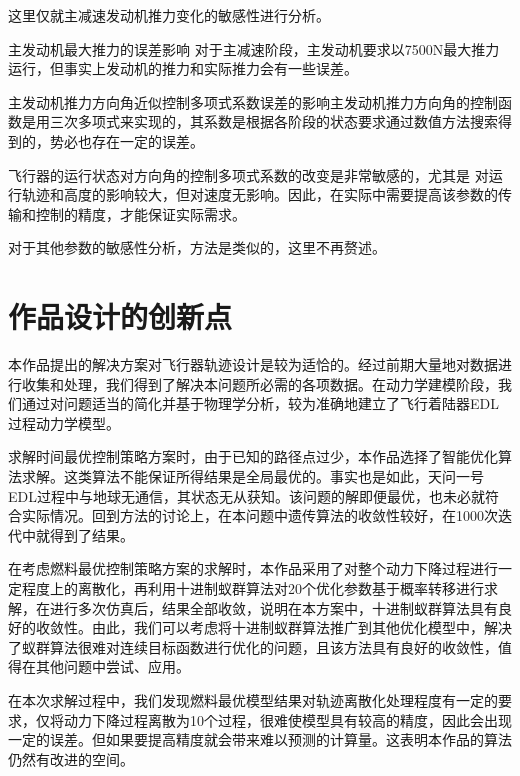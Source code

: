 \documentclass[UTF8,12pt]{ctexart}
\begin{document}
这里仅就主减速发动机推力变化的敏感性进行分析。

主发动机最大推力的误差影响 对于主减速阶段，主发动机要求以7500N最大推力运行，但事实上发动机的推力和实际推力会有一些误差。
           
主发动机推力方向角近似控制多项式系数误差的影响主发动机推力方向角的控制函数是用三次多项式来实现的，其系数是根据各阶段的状态要求通过数值方法搜索得到的，势必也存在一定的误差。
 
飞行器的运行状态对方向角的控制多项式系数的改变是非常敏感的，尤其是 对运行轨迹和高度的影响较大，但对速度无影响。因此，在实际中需要提高该参数的传输和控制的精度，才能保证实际需求。 

对于其他参数的敏感性分析，方法是类似的，这里不再赘述。

\section{作品设计的创新点}
本作品提出的解决方案对飞行器轨迹设计是较为适恰的。经过前期大量地对数据进行收集和处理，我们得到了解决本问题所必需的各项数据。在动力学建模阶段，我们通过对问题适当的简化并基于物理学分析，较为准确地建立了飞行着陆器EDL过程动力学模型。

求解时间最优控制策略方案时，由于已知的路径点过少，本作品选择了智能优化算法求解。这类算法不能保证所得结果是全局最优的。事实也是如此，天问一号EDL过程中与地球无通信，其状态无从获知。该问题的解即便最优，也未必就符合实际情况。回到方法的讨论上，在本问题中遗传算法的收敛性较好，在1000次迭代中就得到了结果。

在考虑燃料最优控制策略方案的求解时，本作品采用了对整个动力下降过程进行一定程度上的离散化，再利用十进制蚁群算法对20个优化参数基于概率转移进行求解，在进行多次仿真后，结果全部收敛，说明在本方案中，十进制蚁群算法具有良好的收敛性。由此，我们可以考虑将十进制蚁群算法推广到其他优化模型中，解决了蚁群算法很难对连续目标函数进行优化的问题，且该方法具有良好的收敛性，值得在其他问题中尝试、应用。

在本次求解过程中，我们发现燃料最优模型结果对轨迹离散化处理程度有一定的要求，仅将动力下降过程离散为10个过程，很难使模型具有较高的精度，因此会出现一定的误差。但如果要提高精度就会带来难以预测的计算量。这表明本作品的算法仍然有改进的空间。
\newpage
\end{document}
